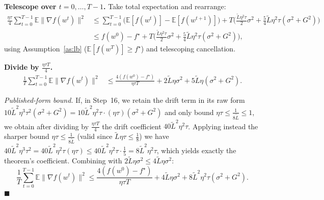 \documentclass{article}
\begin{document}
\textbf{Telescope over $t = 0,\dots,T-1$.} Take total expectation and rearrange:
\begin{align}
\frac{\eta\tau}{4}\sum_{t=0}^{T-1}\mathbb{E}\|\nabla f(w^t)\|^2
&\le \sum_{t=0}^{T-1}\Big(\mathbb{E}[f(w^t)] - \mathbb{E}[f(w^{t+1})]\Big)
 + T\Big(\frac{\tilde L\eta^2\tau}{2}\sigma^2 + \frac{5}{4}\tilde L\eta^2\tau(\sigma^2+G^2)\Big) \nonumber\\
&\le f(w^0) - f^\star + T\Big(\frac{\tilde L\eta^2\tau}{2}\sigma^2 + \frac{5}{4}\tilde L\eta^2\tau(\sigma^2+G^2)\Big),
\tag{Step 20}
\end{align}
using Assumption~\ref{as:lb} ($\mathbb{E}[f(w^T)]\ge f^\star$) and telescoping cancellation.

\textbf{Divide by $\frac{\eta\tau T}{4}$.}
\begin{align}
\frac{1}{T}\sum_{t=0}^{T-1}\mathbb{E}\|\nabla f(w^t)\|^2
&\le \frac{4(f(w^0)-f^\star)}{\eta\tau T}
 + 2\tilde L\eta\sigma^2
 + 5\tilde L\eta(\sigma^2+G^2).
\tag{Step 21}
\end{align}

\medskip
\noindent\emph{Published-form bound.}
If, in Step~16, we retain the drift term in its raw form $10\tilde L^2\eta^3\tau^2(\sigma^2+G^2) = 10\tilde L^2\eta^2\tau\cdot(\eta\tau)(\sigma^2+G^2)$ and only bound $\eta\tau \le \tfrac{1}{8\tilde L} \le 1$, we obtain after dividing by $\tfrac{\eta\tau T}{4}$ the drift coefficient $40\tilde L^2\eta^2\tau$. Applying instead the sharper bound $\eta\tau \le \tfrac{1}{8\tilde L}$ (valid since $\tilde L\eta\tau\le\tfrac18$) we have $40\tilde L^2\eta^3\tau^2 = 40\tilde L^2\eta^2\tau(\eta\tau) \le 40\tilde L^2\eta^2\tau\cdot\tfrac{1}{5} = 8\tilde L^2\eta^2\tau$, which yields exactly the theorem's coefficient. Combining with $2\tilde L\eta\sigma^2 \le 4\tilde L\eta\sigma^2$:
\[
\boxed{\;\frac{1}{T}\sum_{t=0}^{T-1}\mathbb{E}\|\nabla f(w^t)\|^2
\le \frac{4(f(w^0)-f^\star)}{\eta\tau T}
+ 4\tilde L\eta\sigma^2
+ 8\tilde L^2\eta^2\tau(\sigma^2+G^2).\;}
\]
\hfill$\blacksquare$
\end{document}
